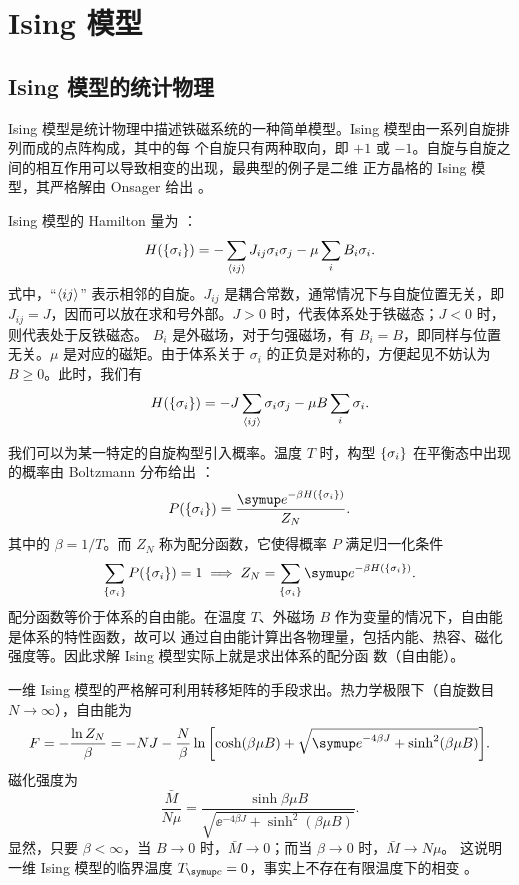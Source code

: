 \chapter{Ising 模型}

\section{Ising 模型的统计物理}
\label{sec:ising-physics}

Ising 模型是统计物理中描述铁磁系统的一种简单模型。Ising 模型由一系列自旋排列而成的点阵构成，其中的每
个自旋只有两种取向，即 $+1$ 或 $-1$。自旋与自旋之间的相互作用可以导致相变的出现，最典型的例子是二维
正方晶格的 Ising 模型，其严格解由 Onsager 给出
\cite{pathria,linzonghan,surukeng,onsager1944crystal}。

Ising 模型的 Hamilton 量为 \cite{pathria,linzonghan}：
\begin{equation}
  H({\{\sigma_i\}}) = -\sum_{\langle ij\rangle} J_{ij}\sigma_i\sigma_j - \mu \sum_{i} B_i\sigma_i.
\end{equation}
式中，“$\langle ij\rangle$” 表示相邻的自旋。$J_{ij}$ 是耦合常数，通常情况下与自旋位置无关，即
$J_{ij}=J$，因而可以放在求和号外部。$J>0$ 时，代表体系处于铁磁态；$J<0$ 时，则代表处于反铁磁态。
$B_i$ 是外磁场，对于匀强磁场，有 $B_i=B$，即同样与位置无关。$\mu$ 是对应的磁矩。由于体系关于
$\sigma_i$ 的正负是对称的，方便起见不妨认为 $B \geqslant 0$。此时，我们有
\begin{equation}
  H({\{\sigma_i\}}) = -J \sum_{\langle ij\rangle} \sigma_i\sigma_j - \mu B \sum_{i} \sigma_i.
\end{equation}

我们可以为某一特定的自旋构型引入概率。温度 $T$ 时，构型 ${\{\sigma_i\}}$ 在平衡态中出现的概率由
Boltzmann 分布给出 \cite{exact}：
\begin{equation}
  \label{eq:ising-probability}
  P(\q{\sigma_i}) = \frac{\ee^{-\beta H(\q{\sigma_i})}}{Z_N}.
\end{equation}
其中的 $\beta=1/T$。而 $Z_N$ 称为配分函数，它使得概率 $P$ 满足归一化条件
\begin{equation}
  \sum_\q{\sigma_i} P(\q{\sigma_i}) = 1
  \implies Z_N = \sum_\q{\sigma_i} \ee^{-\beta H(\q{\sigma_i})}.
\end{equation}
配分函数等价于体系的自由能。在温度 $T$、外磁场 $B$ 作为变量的情况下，自由能是体系的特性函数，故可以
通过自由能计算出各物理量，包括内能、热容、磁化强度等。因此求解 Ising 模型实际上就是求出体系的配分函
数（自由能）。

一维 Ising 模型的严格解可利用转移矩阵的手段求出。热力学极限下（自旋数目 $N\to\infty$），自由能为
\begin{equation}
  F = - \frac{\ln Z_N}{\beta}
    = - N J - \frac{N}{\beta}
              \ln\qty[\cosh(\beta\mu B) + \sqrt{\ee^{-4\beta J} + \sinh^2(\beta\mu B)}].
\end{equation}
磁化强度为
\begin{equation}
  \frac{\bar{M}}{N\mu} = \frac{\sinh{\beta\mu B}}{\sqrt{\ee^{-4\beta J} + \sinh^2(\beta\mu B)}}.
\end{equation}
显然，只要 $\beta<\infty$，当 $B\to 0$ 时，$\bar{M}\to 0$；而当 $\beta\to 0$ 时，$\bar{M}\to N\mu$。
这说明一维 Ising 模型的临界温度 $\Tc=0$，事实上不存在有限温度下的相变 \cite{linzonghan,pathria}。

